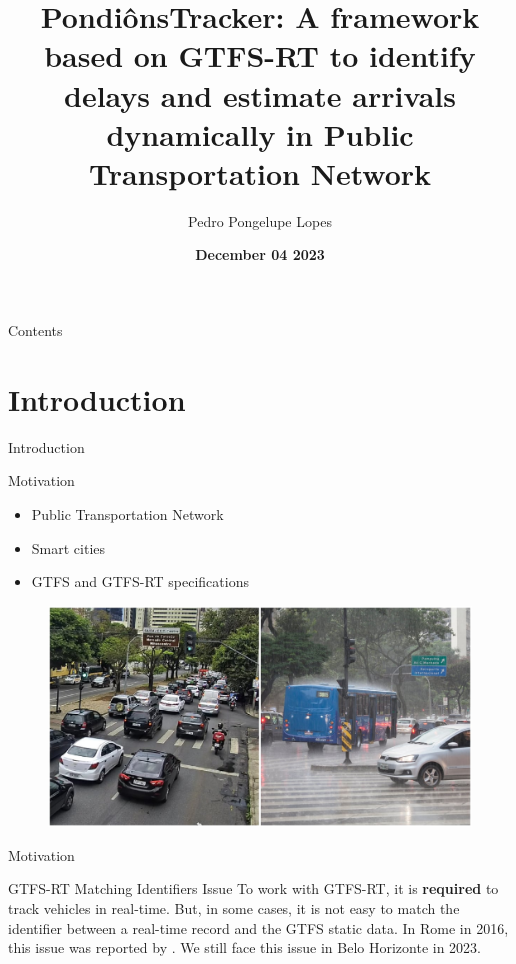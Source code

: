 \documentclass[xcolor=dvipsnames,table]{beamer}
\title{PondiônsTracker: A framework based on GTFS-RT to identify delays and estimate arrivals dynamically in Public Transportation Network}
\author{
        Pedro Pongelupe Lopes
}
\institute{Programa de Pós-Graduação em Informática}
\date{\textbf{December 04 2023} }
\begin{document}
\begin{frame}
        \titlepage
\end{frame}

\begin{frame}{Contents}%
        \tableofcontents[ hideothersubsections]
\end{frame}


\section{Introduction}
\begin{frame}{Introduction}
        \begin{block}{Motivation}
                \begin{itemize}
                        \item Public Transportation Network
                        \item Smart cities 
                        \item GTFS and GTFS-RT specifications
                \end{itemize}
        \end{block}
                \begin{figure}[H]
                        \centering
                        \includegraphics[scale=0.15]{images/chuva-engarrafamento.jpg}
                \end{figure}
\end{frame}

\begin{frame}{Motivation}
        \begin{block}{GTFS-RT Matching Identifiers Issue}
                To work with GTFS-RT, it is \textbf{required} to track vehicles in real-time. But, in some cases, it is not easy to match the identifier between a real-time record and the GTFS static data. In Rome in 2016, this issue was reported by \cite{bigdata}. We still face this issue in Belo Horizonte in 2023.
        \end{block}
\end{frame}
\end{document}
